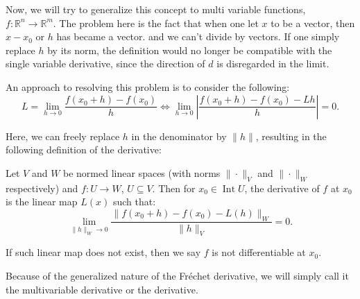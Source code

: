 Now, we will try to generalize this concept to multi variable functions, \( f:
\mathbb{R}^{n} \to  \mathbb{R}^{m} \). The problem here is the fact that when
one let \( x \) to be a vector, then \( x - x_{0} \) or \( h \) has became a
vector. and we can't divide by vectors. If one simply replace \( h \) by its
norm, the definition would no longer be compatible with the single variable
derivative, since the direction of \( d \) is disregarded in the limit.

An approach to resolving this problem is to consider the following:
\[
  L = \lim_{h \to 0} \frac{f(x_{0} + h) - f(x_{0})}{h} \iff \lim_{h \to 0}
  \left| \frac{f(x_{0} + h) - f(x_{0}) - Lh}{h} \right|  = 0
.\] 

Here, we can freely replace \( h \) in the denominator by \( \|h\| \), resulting
in the following definition of the derivative:
\begin{definition}
\label{def:Fréchet derivative}
  Let \( V \) and \( W \) be normed linear spaces (with norms \( \|\cdot\|_{V} \)
  and \( \|\cdot\|_{W} \) respectively) and \( f: U \to W \), \( U \subseteq V
  \). Then for \( x_{0} \in \operatorname{Int} U \), the derivative of \( f \)
  at \( x_{0} \) is the linear map \( L(x) \) such that:
  \[
    \lim_{\|h\|_{W} \to 0} \frac{\|f(x_{0} + h) - f(x_{0}) -
    L(h)\|_{W}}{\|h\|_{V}}  = 0
  .\] 

  If such linear map does not exist, then we say \( f \) is not differentiable
  at \( x_{0} \).
\end{definition}

Because of the generalized nature of the Fréchet derivative, we will simply call
it the multivariable derivative or the derivative.

